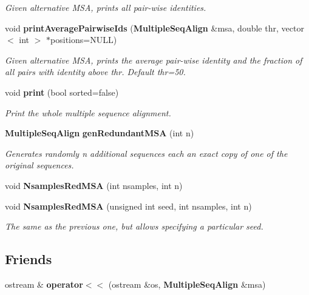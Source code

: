 \begin{CompactItemize}
\begin{CompactList}\small\item\em Given alternative MSA, prints all pair-wise identities. \item\end{CompactList}\item 
void {\bf print\-Average\-Pairwise\-Ids} ({\bf Multiple\-Seq\-Align} \&msa, double thr, vector$<$ int $>$ $\ast$positions=NULL)
\begin{CompactList}\small\item\em Given alternative MSA, prints the average pair-wise identity and the fraction of all pairs with identity above thr. Default thr=50. \item\end{CompactList}\item 
void {\bf print} (bool sorted=false)\label{classMultipleSeqAlign_a28}

\begin{CompactList}\small\item\em Print the whole multiple sequence alignment. \item\end{CompactList}\item 
{\bf Multiple\-Seq\-Align} {\bf gen\-Redundant\-MSA} (int n)\label{classMultipleSeqAlign_a29}

\begin{CompactList}\small\item\em Generates randomly n additional sequences each an exact copy of one of the original sequences. \item\end{CompactList}\item 
void {\bf Nsamples\-Red\-MSA} (int nsamples, int n)
\item 
void {\bf Nsamples\-Red\-MSA} (unsigned int seed, int nsamples, int n)\label{classMultipleSeqAlign_a31}

\begin{CompactList}\small\item\em The same as the previous one, but allows specifying a particular seed. \item\end{CompactList}\end{CompactItemize}
\subsection*{Friends}
\begin{CompactItemize}
\item 
ostream \& {\bf operator$<$$<$} (ostream \&os, {\bf Multiple\-Seq\-Align} \&msa)\label{classMultipleSeqAlign_n0}

\end{CompactItemize}


